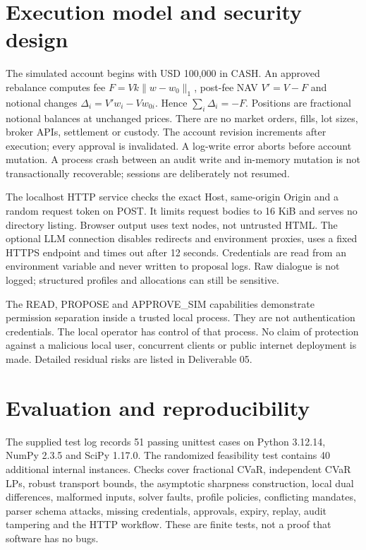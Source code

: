 \documentclass[11pt,a4paper]{article}
\begin{document}
\section{Execution model and security design}
The simulated account begins with USD 100,000 in CASH. An approved rebalance computes fee $F=V k\|w-w_0\|_1$, post-fee NAV $V'=V-F$ and notional changes $\Delta_i=V'w_i-Vw_{0i}$. Hence $\sum_i\Delta_i=-F$. Positions are fractional notional balances at unchanged prices. There are no market orders, fills, lot sizes, broker APIs, settlement or custody. The account revision increments after execution; every approval is invalidated. A log-write error aborts before account mutation. A process crash between an audit write and in-memory mutation is not transactionally recoverable; sessions are deliberately not resumed.

The localhost HTTP service checks the exact Host, same-origin Origin and a random request token on POST. It limits request bodies to 16 KiB and serves no directory listing. Browser output uses text nodes, not untrusted HTML. The optional LLM connection disables redirects and environment proxies, uses a fixed HTTPS endpoint and times out after 12 seconds. Credentials are read from an environment variable and never written to proposal logs. Raw dialogue is not logged; structured profiles and allocations can still be sensitive.

The READ, PROPOSE and APPROVE\_SIM capabilities demonstrate permission separation inside a trusted local process. They are not authentication credentials. The local operator has control of that process. No claim of protection against a malicious local user, concurrent clients or public internet deployment is made. Detailed residual risks are listed in Deliverable 05.

\section{Evaluation and reproducibility}
The supplied test log records 51 passing unittest cases on Python 3.12.14, NumPy 2.3.5 and SciPy 1.17.0. The randomized feasibility test contains 40 additional internal instances. Checks cover fractional CVaR, independent CVaR LPs, robust transport bounds, the asymptotic sharpness construction, local dual differences, malformed inputs, solver faults, profile policies, conflicting mandates, parser schema attacks, missing credentials, approvals, expiry, replay, audit tampering and the HTTP workflow. These are finite tests, not a proof that software has no bugs.
\end{document}
